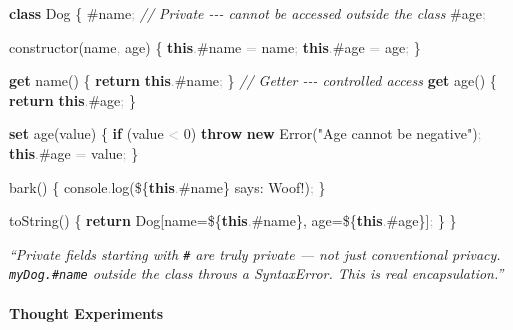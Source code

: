 \documentclass[
  justified,
  openright,
]{tufte-book}
\let\paragraph\paragraph
\newcommand{\KeywordTok}[1]{\textcolor{CodeKeyword}{\textbf{#1}}}  %
\newcommand{\StringTok}[1]{\textcolor{CodeString}{#1}}              %
\newcommand{\CommentTok}[1]{\textcolor{CodeComment}{\textit{#1}}}  %
\newcommand{\CodeNumTok}[1]{\textcolor{CodeNumber}{#1}}             %
\newcommand{\CodeFuncTok}[1]{\textcolor{CodeKeyword}{#1}}           %
\newcommand{\CodeTypeTok}[1]{\textcolor{CodeType}{#1}}              %
\newcommand{\OperatorTok}[1]{\textcolor{DarkGray}{#1}}              %
\newenvironment{Shaded}{%
  \begin{mdframed}[style=TufteCode]%
}{%
  \end{mdframed}%
}
\let\paragraph\paragraph
\begin{document}
\begin{Shaded}
\begin{Highlighting}[]
\KeywordTok{class} Dog \{
  \#name\OperatorTok{;} \CommentTok{// Private {-}{-}{-} cannot be accessed outside the class}
  \#age\OperatorTok{;}
 
  \CodeFuncTok{constructor}(name\OperatorTok{,} age) \{
    \KeywordTok{this}\OperatorTok{.}\#\CodeTypeTok{name} \OperatorTok{=} name\OperatorTok{;}
    \KeywordTok{this}\OperatorTok{.}\#\CodeTypeTok{age} \OperatorTok{=} age\OperatorTok{;}
  \}
 
  \KeywordTok{get} \CodeFuncTok{name}() \{
    \KeywordTok{return} \KeywordTok{this}\OperatorTok{.}\#\CodeTypeTok{name}\OperatorTok{;}
  \} \CommentTok{// Getter {-}{-}{-} controlled access}
  \KeywordTok{get} \CodeFuncTok{age}() \{
    \KeywordTok{return} \KeywordTok{this}\OperatorTok{.}\#\CodeTypeTok{age}\OperatorTok{;}
  \}
 
  \KeywordTok{set} \CodeFuncTok{age}(value) \{
    \KeywordTok{if} (value \OperatorTok{\textless{}} \CodeNumTok{0}) \KeywordTok{throw} \KeywordTok{new} Error(\StringTok{"Age cannot be negative"})\OperatorTok{;}
    \KeywordTok{this}\OperatorTok{.}\#\CodeTypeTok{age} \OperatorTok{=} value\OperatorTok{;}
  \}
 
  \CodeFuncTok{bark}() \{
    console\OperatorTok{.}\CodeFuncTok{log}(\StringTok{\textasciigrave{}}\StringTok{\$\{}\KeywordTok{this}\OperatorTok{.}\#\CodeTypeTok{name}\StringTok{\}}\StringTok{ says: Woof!\textasciigrave{}})\OperatorTok{;}
  \}
 
  \CodeFuncTok{toString}() \{
    \KeywordTok{return} \StringTok{\textasciigrave{}Dog[name=}\StringTok{\$\{}\KeywordTok{this}\OperatorTok{.}\#\CodeTypeTok{name}\StringTok{\}}\StringTok{, age=}\StringTok{\$\{}\KeywordTok{this}\OperatorTok{.}\#\CodeTypeTok{age}\StringTok{\}}\StringTok{]\textasciigrave{}}\OperatorTok{;}
  \}
\}
\end{Highlighting}
\end{Shaded}

\emph{``Private fields starting with \texttt{\#} are truly private ---
not just conventional privacy. \texttt{myDog.\#name} outside the class
throws a SyntaxError. This is real encapsulation.''}

\paragraph{Thought Experiments}\label{thought-experiments-26}
\end{document}
